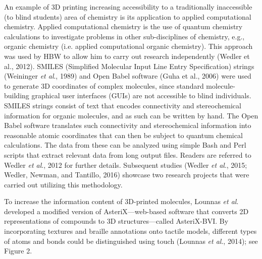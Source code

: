 \documentclass[11.5pt]{sig-alternate} %
\begin{document}
\begin{large}
An example of 3D printing increasing accessibility to a traditionally inaccessible (to blind students) area of chemistry is its application to applied computational chemistry. Applied computational chemistry is the use of quantum chemistry calculations to investigate problems in other sub-disciplines of chemistry, e.g., organic chemistry (i.e. applied computational organic chemistry). This approach was used by HBW to allow him to carry out research independently (Wedler et al., 2012). SMILES (Simplified Molecular Input Line Entry Specification) strings (Weininger \textit{et al}., 1989) and Open Babel software (Guha et al., 2006) were used to generate 3D coordinates of complex molecules, since standard molecule-building graphical user interfaces (GUIs) are not accessible to blind individuals. SMILES strings consist of text that encodes connectivity and stereochemical information for organic molecules, and as such can be written by hand. The Open Babel software translates such connectivity and stereochemical information into reasonable atomic coordinates that can then be subject to quantum chemical calculations. The data from these can be analyzed using simple Bash and Perl scripts that extract relevant data from long output files. Readers are referred to Wedler \textit{et al}., 2012 for further details. Subsequent studies (Wedler \textit{et al}., 2015; Wedler, Newman, and Tantillo, 2016) showcase two research projects that were carried out utilizing this methodology.

To increase the information content of 3D-printed molecules, Lounnas \textit{et al}. developed a modified version of AsteriX—web-based software that converts 2D representations of compounds to 3D structures—called AsteriX-BVI. By incorporating textures and braille annotations onto tactile models, different types of atoms and bonds could be distinguished using touch (Lounnas \textit{et al}., 2014); see Figure 2.


\end{large}
\end{document}
